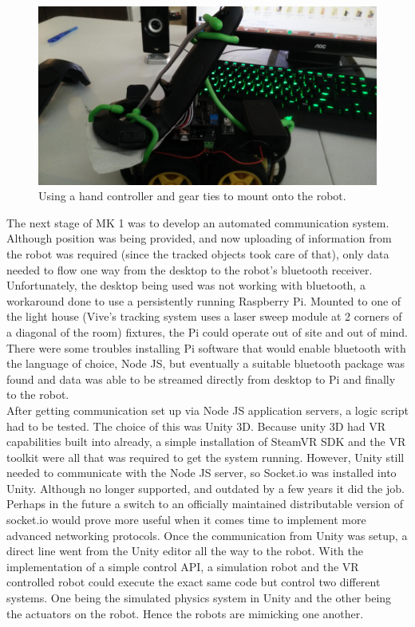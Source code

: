 \documentclass[10pt,a4paper]{article}
\begin{document}
	\begin{figure}
		\centering
		\includegraphics[width=.6\textwidth]{robotv1.jpg}
		\caption{Using a hand controller and gear ties to mount onto the robot.}
		\label{fig:mimic-mk1}
	\end{figure}
	
	The next stage of MK 1 was to develop an automated communication system. Although position was being provided, and now uploading of information from the robot was required (since the tracked objects took care of that), only data needed to flow one way from the desktop to the robot's bluetooth receiver. Unfortunately, the desktop being used was not working with bluetooth, a workaround done to use a persistently running Raspberry Pi. Mounted to one of the light house (Vive's tracking system uses a laser sweep module at 2 corners of a diagonal of the room) fixtures, the Pi could operate out of site and out of mind. There were some troubles installing Pi software that would enable bluetooth with the language of choice, Node JS, but eventually a suitable bluetooth package was found and data was able to be streamed directly from desktop to Pi and finally to the robot.
	\\
	After getting communication set up via Node JS application servers, a logic script had to be tested. The choice of this was Unity 3D. Because unity 3D had VR capabilities built into already, a simple installation of SteamVR SDK and the VR toolkit were all that was required to get the system running. However, Unity still needed to communicate with the Node JS server, so Socket.io was installed into Unity. Although no longer supported, and outdated by a few years it did the job. Perhaps in the future a switch to an officially maintained distributable version of socket.io would prove more useful when it comes time to implement more advanced networking protocols. Once the communication from Unity was setup, a direct line went from the Unity editor all the way to the robot. With the implementation of a simple control API, a simulation robot and the VR controlled robot could execute the exact same code but control two different systems. One being the simulated physics system in Unity and the other being the actuators on the robot. Hence the robots are mimicking one another.
\end{document}
